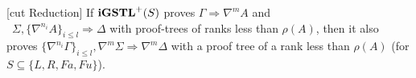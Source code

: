 \begin{thm}\label{thm:igstl-cut-reduction}[cut Reduction]
  If $\mathbf{iGSTL}^+(S)$ proves $\Gamma \Rightarrow \nabla^m A$ and\\\ $\Sigma , \{\nabla^{n_i} A\}_{i \leq l} \Rightarrow \Delta$ with proof-trees of ranks less than $\rho(A)$, then it also proves $\{\nabla^{n_i} \Gamma\}_{i \leq l} , \nabla^m\Sigma \Rightarrow \nabla^m\Delta$ with a proof tree of a rank less than $\rho(A)$ (for $S \subseteq \{L, R, Fa, Fu\}$).
\end{thm}
